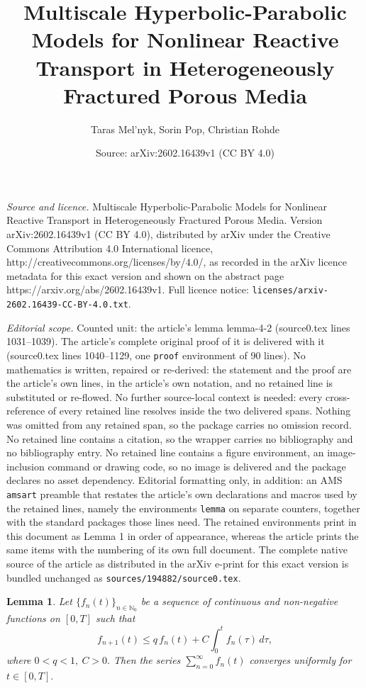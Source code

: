\documentclass[10pt,a4paper]{amsart}
\title{Multiscale Hyperbolic-Parabolic Models for Nonlinear Reactive Transport in Heterogeneously Fractured Porous Media}
\author{Taras Mel'nyk, Sorin Pop, Christian Rohde}
\date{Source: arXiv:2602.16439v1 (CC BY 4.0)}
\newtheorem{lemma}{Lemma}
\begin{document}
\maketitle

\noindent\emph{Source and licence.} Multiscale Hyperbolic-Parabolic Models for Nonlinear Reactive Transport in Heterogeneously Fractured Porous Media. Version arXiv:2602.16439v1 (CC BY 4.0), distributed by arXiv under the Creative Commons Attribution 4.0 International licence, http://creativecommons.org/licenses/by/4.0/, as recorded in the arXiv licence metadata for this exact version and shown on the abstract page https://arxiv.org/abs/2602.16439v1. Full licence notice: \texttt{licenses/arxiv-2602.16439-CC-BY-4.0.txt}.\par\smallskip

\noindent\textit{Editorial scope.} Counted unit: the article's lemma lemma-4-2 (source0.tex lines 1031--1039). The article's complete original proof of it is delivered with it (source0.tex lines 1040--1129, one \texttt{proof} environment of 90 lines). No mathematics is written, repaired or re-derived: the statement and the proof are the article's own lines, in the article's own notation, and no retained line is substituted or re-flowed.  No further source-local context is needed: every cross-reference of every retained line resolves inside the two delivered spans.  Nothing was omitted from any retained span, so the package carries no omission record.  No retained line contains a citation, so the wrapper carries no bibliography and no bibliography entry.  No retained line contains a figure environment, an image-inclusion command or drawing code, so no image is delivered and the package declares no asset dependency.  Editorial formatting only, in addition: an AMS \texttt{amsart} preamble that restates the article's own declarations and macros used by the retained lines, namely the environments \texttt{lemma} on separate counters, together with the standard packages those lines need.  The retained environments print in this document as Lemma 1 in order of appearance, whereas the article prints the same items with the numbering of its own full document.  The complete native source of the article as distributed in the arXiv e-print for this exact version is bundled unchanged as \texttt{sources/194882/source0.tex}.
	\begin{lemma}\label{lemma-4-2}
		Let $\{f_n(t)\}_{n\in \mathbb{N}_0}$ be a sequence of continuous and non-negative functions on $[0,T]$
		such that
		$$
		f_{n+1}(t) \le q\,f_n(t) + C \int_{0}^{t} f_n(\tau)\, d\tau,
		$$
		where $ 0 < q < 1,\ C > 0.$ Then the series $\sum_{n=0}^{\infty} f_n(t) $
		converges uniformly for $t\in[0,T].$ 
	\end{lemma}
\end{document}
